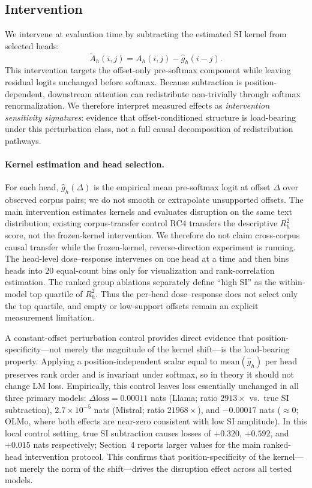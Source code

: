 \documentclass{article}
\begin{document}
\subsection{Intervention}
We intervene at evaluation time by subtracting the estimated SI kernel from selected heads:
\begin{equation}
\tilde A_h(i,j) = A_h(i,j) - \hat g_h(i-j).
\end{equation}
This intervention targets the offset-only pre-softmax component while leaving residual logits unchanged before softmax. Because subtraction is position-dependent, downstream attention can redistribute non-trivially through softmax renormalization. We therefore interpret measured effects as \emph{intervention sensitivity signatures}: evidence that offset-conditioned structure is load-bearing under this perturbation class, not a full causal decomposition of redistribution pathways.

\paragraph{Kernel estimation and head selection.}
For each head, $\hat g_h(\Delta)$ is the empirical mean pre-softmax logit at offset $\Delta$ over observed corpus pairs; we do not smooth or extrapolate unsupported offsets. The main intervention estimates kernels and evaluates disruption on the same text distribution; existing corpus-transfer control RC4 transfers the descriptive $R_h^2$ score, not the frozen-kernel intervention. We therefore do not claim cross-corpus causal transfer while the frozen-kernel, reverse-direction experiment is running.
The head-level dose--response intervenes on one head at a time and then bins heads into 20 equal-count bins only for visualization and rank-correlation estimation.
The ranked group ablations separately define ``high SI'' as the within-model top quartile of $R_h^2$.
Thus the per-head dose--response does not select only the top quartile, and empty or low-support offsets remain an explicit measurement limitation.

A constant-offset perturbation control provides direct evidence that position-specificity---not merely the magnitude of the kernel shift---is the load-bearing property. Applying a position-independent scalar equal to $\text{mean}(\hat{g}_h)$ per head preserves rank order and is invariant under softmax, so in theory it should not change LM loss. Empirically, this control leaves loss essentially unchanged in all three primary models: $\Delta \text{loss} = 0.00011$ nats (Llama; ratio $2913\times$ vs.\ true SI subtraction), $2.7\times10^{-5}$ nats (Mistral; ratio $21968\times$), and $-0.00017$ nats ($\approx 0$; OLMo, where both effects are near-zero consistent with low SI amplitude). In this local control setting, true SI subtraction causes losses of $+0.320$, $+0.592$, and $+0.015$ nats respectively; Section~4 reports larger values for the main ranked-head intervention protocol. This confirms that position-specificity of the kernel---not merely the norm of the shift---drives the disruption effect across all tested models.
\end{document}
